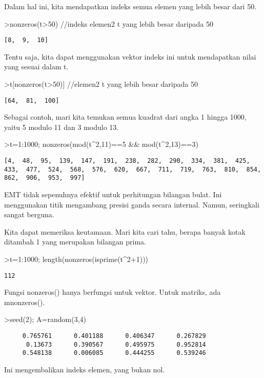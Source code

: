 \documentclass[
]{book}
\begin{document}
Dalam hal ini, kita mendapatkan indeks semua elemen yang lebih besar dari 50.

\textgreater nonzeros(t\textgreater50) //indeks elemen2 t yang lebih besar daripada 50

\begin{verbatim}
[8,  9,  10]
\end{verbatim}

Tentu saja, kita dapat menggunakan vektor indeks ini untuk mendapatkan nilai yang sesuai dalam t.

\textgreater t{[}nonzeros(t\textgreater50){]} //elemen2 t yang lebih besar daripada 50

\begin{verbatim}
[64,  81,  100]
\end{verbatim}

Sebagai contoh, mari kita temukan semua kuadrat dari angka 1 hingga 1000, yaitu 5 modulo 11 dan 3 modulo 13.

\textgreater t=1:1000; nonzeros(mod(t\^{}2,11)==5 \&\& mod(t\^{}2,13)==3)

\begin{verbatim}
[4,  48,  95,  139,  147,  191,  238,  282,  290,  334,  381,  425,
433,  477,  524,  568,  576,  620,  667,  711,  719,  763,  810,  854,
862,  906,  953,  997]
\end{verbatim}

EMT tidak sepenuhnya efektif untuk perhitungan bilangan bulat. Ini menggunakan titik mengambang presisi ganda secara internal. Namun, seringkali sangat berguna.

Kita dapat memeriksa keutamaan. Mari kita cari tahu, berapa banyak kotak ditambah 1 yang merupakan bilangan prima.

\textgreater t=1:1000; length(nonzeros(isprime(t\^{}2+1)))

\begin{verbatim}
112
\end{verbatim}

Fungsi nonzeros() hanya berfungsi untuk vektor. Untuk matriks, ada mnonzeros().

\textgreater seed(2); A=random(3,4)

\begin{verbatim}
     0.765761      0.401188      0.406347      0.267829 
      0.13673      0.390567      0.495975      0.952814 
     0.548138      0.006085      0.444255      0.539246 
\end{verbatim}

Ini mengembalikan indeks elemen, yang bukan nol.
\end{document}
